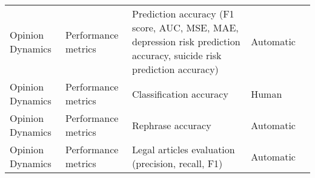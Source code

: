\begin{small}
\begin{center}
\begin{longtable}{@{}p{}p{}p{}p{}p{}@{}}
Opinion Dynamics         & Performance metrics                 & Prediction accuracy (F1 score, AUC, MSE, MAE, depression risk prediction accuracy, suicide risk prediction accuracy)                                                                                        & Automatic & \cite{Yu2024TowardsMA}                                                                                                                                                                                                                                                                                                                                                                                                   \\
Opinion Dynamics         & Performance metrics                 & Classification accuracy                                                                                                                                                                                     & Human     & \cite{Chan2023ChatEvalTB}                                                                                                                                                                                                                                                                                                                                                                                                  \\
Opinion Dynamics         & Performance metrics                 & Rephrase accuracy                                                                                                                                                                                           & Automatic & \cite{Ju2024FloodingSO}                                                                                                                                                                                                                                                                                                                                                                                                \\
Opinion Dynamics         & Performance metrics                 & Legal articles evaluation (precision, recall, F1)                                                                                                                                                           & Automatic & \cite{He2024AgentsCourtBJ}                                                                                                                                                                                                                                                                                                                                                                                \\

\end{longtable}
\end{center}
\end{small}
